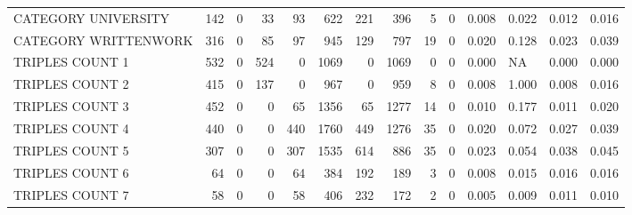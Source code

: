 \begin{tabular}{lrrrrrrrrrllll}
 CATEGORY UNIVERSITY      &             142 &             0 &              33 &              93 &             622 &  221 &  396 &    5 &    0 & 0.008 & 0.022 & 0.012 & 0.016 \\
 CATEGORY WRITTENWORK     &             316 &             0 &              85 &              97 &             945 &  129 &  797 &   19 &    0 & 0.020 & 0.128 & 0.023 & 0.039 \\
 TRIPLES COUNT 1          &             532 &             0 &             524 &               0 &            1069 &    0 & 1069 &    0 &    0 & 0.000 & NA    & 0.000 & 0.000 \\
 TRIPLES COUNT 2          &             415 &             0 &             137 &               0 &             967 &    0 &  959 &    8 &    0 & 0.008 & 1.000 & 0.008 & 0.016 \\
 TRIPLES COUNT 3          &             452 &             0 &               0 &              65 &            1356 &   65 & 1277 &   14 &    0 & 0.010 & 0.177 & 0.011 & 0.020 \\
 TRIPLES COUNT 4          &             440 &             0 &               0 &             440 &            1760 &  449 & 1276 &   35 &    0 & 0.020 & 0.072 & 0.027 & 0.039 \\
 TRIPLES COUNT 5          &             307 &             0 &               0 &             307 &            1535 &  614 &  886 &   35 &    0 & 0.023 & 0.054 & 0.038 & 0.045 \\
 TRIPLES COUNT 6          &              64 &             0 &               0 &              64 &             384 &  192 &  189 &    3 &    0 & 0.008 & 0.015 & 0.016 & 0.016 \\
 TRIPLES COUNT 7          &              58 &             0 &               0 &              58 &             406 &  232 &  172 &    2 &    0 & 0.005 & 0.009 & 0.011 & 0.010 \\
\hline
\end{tabular}